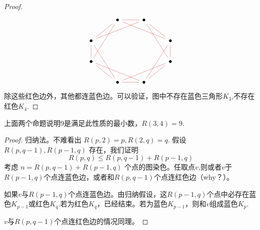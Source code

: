 \documentclass[oneside]{book}
\begin{document}
\begin{proof}
    \[\begin{tikzcd}
        & \bullet & \bullet \\
        \bullet &&& \bullet \\
        \bullet &&& \bullet \\
        & \bullet & \bullet
        \arrow[color={rgb,255:red,214;green,92;blue,92}, no head, from=1-2, to=1-3]
        \arrow[color={rgb,255:red,214;green,92;blue,92}, no head, from=1-2, to=2-1]
        \arrow[color={rgb,255:red,214;green,92;blue,92}, no head, from=1-2, to=2-4]
        \arrow[color={rgb,255:red,214;green,92;blue,92}, no head, from=1-2, to=3-1]
        \arrow[color={rgb,255:red,214;green,92;blue,92}, no head, from=1-3, to=2-4]
        \arrow[color={rgb,255:red,214;green,92;blue,92}, no head, from=1-3, to=3-4]
        \arrow[color={rgb,255:red,214;green,92;blue,92}, no head, from=2-1, to=1-3]
        \arrow[color={rgb,255:red,214;green,92;blue,92}, no head, from=2-1, to=3-1]
        \arrow[color={rgb,255:red,214;green,92;blue,92}, no head, from=2-1, to=4-2]
        \arrow[color={rgb,255:red,214;green,92;blue,92}, no head, from=2-4, to=3-4]
        \arrow[color={rgb,255:red,214;green,92;blue,92}, no head, from=2-4, to=4-3]
        \arrow[color={rgb,255:red,214;green,92;blue,92}, no head, from=3-1, to=4-2]
        \arrow[color={rgb,255:red,214;green,92;blue,92}, no head, from=3-4, to=4-2]
        \arrow[color={rgb,255:red,214;green,92;blue,92}, no head, from=4-2, to=4-3]
        \arrow[color={rgb,255:red,214;green,92;blue,92}, no head, from=4-3, to=3-1]
        \arrow[color={rgb,255:red,214;green,92;blue,92}, no head, from=4-3, to=3-4]
    \end{tikzcd}\]
    除这些红色边外，其他都连蓝色边。可以验证，图中不存在蓝色三角形$K_3$,不存在红色$K_4$.
\end{proof}

上面两个命题说明9是满足此性质的最小数，$R(3,4) = 9$.

\begin{proof}
    归纳法。不难看出 $R(p,2) = p, R(2, q) = q$.
    假设 $R(p, q-1), R(p-1,q)$ 存在，我们证明
    \[R(p,q) \le R(p,q-1) + R(p-1, q)\]
    考虑 $n = R(p,q-1) + R(p-1, q)$ 个点的图染色。任取点$v$,则或者$v$于$R(p-1,q)$个点连蓝色边，或者和$R(p,q-1)$个点连红色边（why？）。
    
    如果$v$与$R(p-1,q)$个点连蓝色边。由归纳假设，这$R(p-1,q)$个点中必存在蓝色$K_{p-1}$或红色$K_q$.若为红色$K_q$，已经结束。若为蓝色$K_{p-1}$，则和$v$组成蓝色$K_p$.

    $v$与$R(p,q-1)$个点连红色边的情况同理。
\end{proof}
\end{document}
